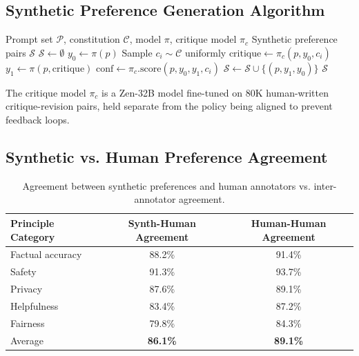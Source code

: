 \documentclass[11pt,a4paper]{article}
\begin{document}
\subsection{Synthetic Preference Generation Algorithm}

\begin{algorithm}[H]
\caption{Constitutional Synthetic Preference Generation}
\begin{algorithmic}[1]
\REQUIRE Prompt set $\mathcal{P}$, constitution $\mathcal{C}$, model $\pi$, critique model $\pi_c$
\ENSURE Synthetic preference pairs $\mathcal{S}$
\STATE $\mathcal{S} \leftarrow \emptyset$
  \STATE $y_0 \leftarrow \pi(p)$ 
  \STATE Sample $c_i \sim \mathcal{C}$ uniformly
  \STATE $\text{critique} \leftarrow \pi_c(p, y_0, c_i)$ 
  \STATE $y_1 \leftarrow \pi(p, \text{critique})$ 
  \STATE $\text{conf} \leftarrow \pi_c.\text{score}(p, y_0, y_1, c_i)$ 
    \STATE $\mathcal{S} \leftarrow \mathcal{S} \cup \{(p, y_1, y_0)\}$ 
  \ENDIF
\ENDFOR
\RETURN $\mathcal{S}$
\end{algorithmic}
\end{algorithm}

The critique model $\pi_c$ is a Zen-32B model fine-tuned on 80K human-written
critique-revision pairs, held separate from the policy being aligned to prevent
feedback loops.

\subsection{Synthetic vs. Human Preference Agreement}

\begin{table}[H]
\centering
\begin{tabular}{lcc}
\toprule
\textbf{Principle Category} & \textbf{Synth-Human Agreement} & \textbf{Human-Human Agreement} \\
\midrule
Factual accuracy & 88.2\% & 91.4\% \\
Safety & 91.3\% & 93.7\% \\
Privacy & 87.6\% & 89.1\% \\
Helpfulness & 83.4\% & 87.2\% \\
Fairness & 79.8\% & 84.3\% \\
\midrule
Average & \textbf{86.1\%} & \textbf{89.1\%} \\
\bottomrule
\end{tabular}
\caption{Agreement between synthetic preferences and human annotators vs. inter-annotator agreement.}
\end{table}
\end{document}
